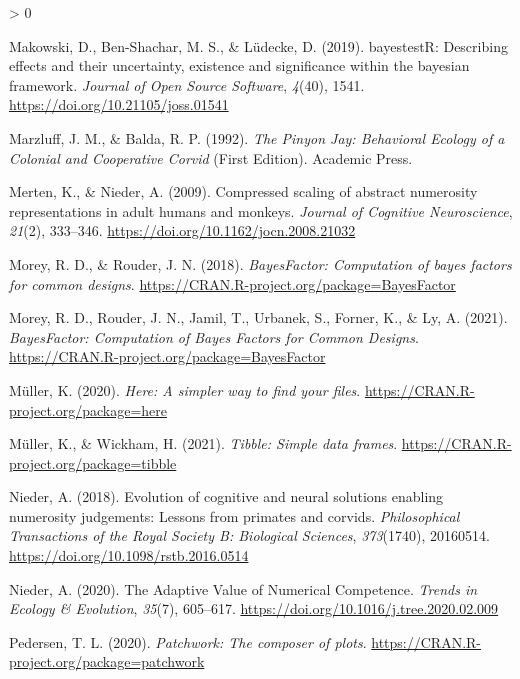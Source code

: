 \documentclass[
  english,
  ,doc,floatsintext]{apa6}
\newlength{\cslhangindent}
\newenvironment{CSLReferences}[2] %
 {%
  \setlength{\parindent}{0pt}
  \ifodd #1 \everypar{\setlength{\hangindent}{\cslhangindent}}\ignorespaces\fi
  \ifnum #2 > 0
  \setlength{\parskip}{#2\baselineskip}
  \fi
 }%
 {}
\begin{document}
\begin{CSLReferences}{1}{0}
\leavevmode\hypertarget{ref-R-bayestestR}{}%
Makowski, D., Ben-Shachar, M. S., \& Lüdecke, D. (2019). bayestestR: Describing effects and their uncertainty, existence and significance within the bayesian framework. \emph{Journal of Open Source Software}, \emph{4}(40), 1541. \url{https://doi.org/10.21105/joss.01541}

\leavevmode\hypertarget{ref-Marzluff.Balda.1992}{}%
Marzluff, J. M., \& Balda, R. P. (1992). \emph{The {Pinyon} {Jay}: {Behavioral} {Ecology} of a {Colonial} and {Cooperative} {Corvid}} (First Edition). Academic Press.

\leavevmode\hypertarget{ref-Merten.Nieder.2009}{}%
Merten, K., \& Nieder, A. (2009). Compressed scaling of abstract numerosity representations in adult humans and monkeys. \emph{Journal of Cognitive Neuroscience}, \emph{21}(2), 333--346. \url{https://doi.org/10.1162/jocn.2008.21032}

\leavevmode\hypertarget{ref-R-BayesFactor}{}%
Morey, R. D., \& Rouder, J. N. (2018). \emph{BayesFactor: Computation of bayes factors for common designs}. \url{https://CRAN.R-project.org/package=BayesFactor}

\leavevmode\hypertarget{ref-Morey.etal.2021}{}%
Morey, R. D., Rouder, J. N., Jamil, T., Urbanek, S., Forner, K., \& Ly, A. (2021). \emph{{BayesFactor}: {Computation} of {Bayes} {Factors} for {Common} {Designs}}. \url{https://CRAN.R-project.org/package=BayesFactor}

\leavevmode\hypertarget{ref-R-here}{}%
Müller, K. (2020). \emph{Here: A simpler way to find your files}. \url{https://CRAN.R-project.org/package=here}

\leavevmode\hypertarget{ref-R-tibble}{}%
Müller, K., \& Wickham, H. (2021). \emph{Tibble: Simple data frames}. \url{https://CRAN.R-project.org/package=tibble}

\leavevmode\hypertarget{ref-Nieder.2018}{}%
Nieder, A. (2018). Evolution of cognitive and neural solutions enabling numerosity judgements: Lessons from primates and corvids. \emph{Philosophical Transactions of the Royal Society B: Biological Sciences}, \emph{373}(1740), 20160514. \url{https://doi.org/10.1098/rstb.2016.0514}

\leavevmode\hypertarget{ref-Nieder.2020}{}%
Nieder, A. (2020). The {Adaptive} {Value} of {Numerical} {Competence}. \emph{Trends in Ecology \& Evolution}, \emph{35}(7), 605--617. \url{https://doi.org/10.1016/j.tree.2020.02.009}

\leavevmode\hypertarget{ref-R-patchwork}{}%
Pedersen, T. L. (2020). \emph{Patchwork: The composer of plots}. \url{https://CRAN.R-project.org/package=patchwork}


\end{CSLReferences}
\end{document}
